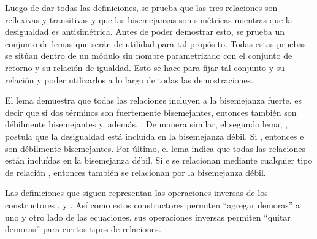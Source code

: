 Luego de dar todas las definiciones, se prueba que las tres relaciones son reflexivas y transitivas y que las bisemejanzas son simétricas mientras que la desigualdad es antisimétrica. Antes de poder demostrar esto, se prueba un conjunto de lemas que serán de utilidad para tal propósito. Todas estas pruebas se sitúan dentro de un módulo sin nombre parametrizado con el conjunto  de retorno y su relación de igualdad. Esto se hace para fijar tal conjunto y su relación y poder utilizarlos a lo largo de todas las demostraciones.


El lema \AgdaFunction{$\cong\Rightarrow$} demuestra que todas las relaciones incluyen a la bisemejanza fuerte, es decir que si dos términos  \AgdaSymbol{:}  \AgdaDatatype{$\bot$} son fuertemente bisemejantes, entonces también son débilmente bisemejantes y, además,  \AgdaFunction{$\gtrsim$} . De manera similar, el segundo lema, \AgdaFunction{$\gtrsim\Rightarrow$}, postula que la desigualdad está incluída en la bisemejanza débil. Si  \AgdaFunction{$\gtrsim$} , entonces  e  son débilmente bisemejantes. Por último, el lema \AgdaFunction{$\Rightarrow\approx$} indica que todas las relaciones están incluídas en la bisemejanza débil. Si  e  se relacionan mediante cualquier tipo de relación , entonces también se relacionan por la bisemejanza débil. 

Las definiciones que siguen representan las operaciones inversas de los constructores ,  y . Así como estos constructores permiten ``agregar demoras'' a uno y otro lado de las ecuaciones, sus operaciones inversas permiten ``quitar demoras'' para ciertos tipos de relaciones. 


